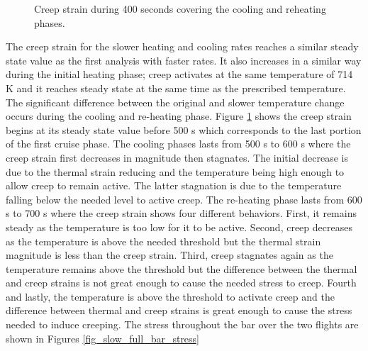\documentclass[conf]{new-aiaa}
\begin{document}
\begin{figure}[H]
  \centering
  \caption{ Creep strain during 400 seconds covering the cooling and reheating phases.}
  \label{fig_slow_touchdown}
\end{figure}

The creep strain for the slower heating and cooling rates 
reaches a similar steady state value as the first analysis with faster rates.
It also increases in a similar way during the initial 
heating phase;
creep activates at the same temperature of 714 K and
it reaches steady state at the same time as the prescribed temperature.
The significant difference between the original and slower temperature
change occurs during the cooling and re-heating phase.
Figure \ref{fig_slow_touchdown} shows the creep strain
begins at its steady state value before 500 s
which corresponds to the last portion of the first cruise phase.
The cooling phases lasts from 500 s to 600 s where
the creep strain first decreases in magnitude then stagnates.
The initial decrease is due to the thermal strain reducing and
the temperature being high enough to allow creep to remain active.
The latter stagnation is due to the temperature falling below
the needed level to active creep. 
The re-heating phase lasts from 600 s to 700 s where the
creep strain shows four different behaviors.
First, it remains steady as the temperature is too low for it to be active.
Second, creep decreases as the temperature is above the needed threshold
but the thermal strain magnitude is less than the creep strain.
Third, creep stagnates again as the temperature remains 
above the threshold but the difference
between the thermal and creep strains is not great enough to cause
the needed stress to creep. 
Fourth and lastly, the temperature is above the threshold to activate 
creep and the difference between thermal and creep strains is 
great enough to cause the stress needed to induce creeping.
The stress 
throughout the bar
over the two flights are shown in Figures 
\ref{fig_slow_full_bar_stress} 
\end{document}
